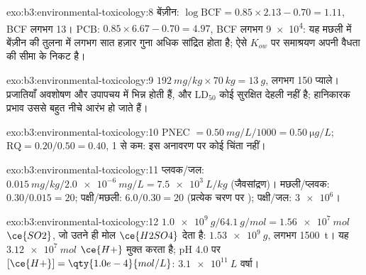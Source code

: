 \begin{solution}{exo:b3:environmental-toxicology:8}
बेंज़ीन: $\log\mathrm{BCF} = 0.85 \times 2.13 - 0.70 = 1.11$, BCF लगभग 13। PCB: $0.85 \times 6.67 - 0.70 = 4.97$, BCF लगभग
\num{9e4}: यह मछली में बेंज़ीन की तुलना में लगभग सात हज़ार गुना अधिक सांद्रित होता है; ऐसे
$K_{ow}$ पर समाश्रयण अपनी वैधता की सीमा के निकट है।
\end{solution}

\begin{solution}{exo:b3:environmental-toxicology:9}
$\qty{192}{mg/kg} \times \qty{70}{kg} = \qty{13}{g}$, लगभग 150 प्याले। प्रजातियाँ अवशोषण और उपापचय में भिन्न होती हैं,
और $\mathrm{LD_{50}}$ कोई सुरक्षित देहली नहीं है; हानिकारक प्रभाव उससे बहुत नीचे आरंभ हो जाते हैं।
\end{solution}

\begin{solution}{exo:b3:environmental-toxicology:10}
PNEC $= \qty{0.50}{mg/L}/1000 = \qty{0.50}{\micro g/L}$; $\mathrm{RQ} = 0.20/0.50 = 0.40$, 1 से कम: इस अनावरण पर कोई चिंता नहीं।
\end{solution}

\begin{solution}{exo:b3:environmental-toxicology:11}
प्लवक/जल: $\qty{0.015}{mg/kg}/\qty{2.0e-6}{mg/L} = \qty{7.5e3}{L/kg}$ (जैवसांद्रण)। मछली/प्लवक: $0.30/0.015 = 20$;
पक्षी/मछली: $6.0/0.30 = 20$ (प्रत्येक चरण पर ); पक्षी/जल: $\num{3e6}$।
\end{solution}

\begin{solution}{exo:b3:environmental-toxicology:12}
$\qty{1.0e9}{g}/\qty{64.1}{g/mol} = \qty{1.56e7}{mol}$ $\ce{SO2}$, जो उतने ही मोल $\ce{H2SO4}$ देता है: $\qty{1.53e9}{g}$, लगभग \qty{1500}{t}। यह
$\qty{3.12e7}{mol}$ $\ce{H+}$ मुक्त करता है; pH 4.0 पर $[\ce{H+}] = \qty{1.0e-4}{mol/L}$: $\qty{3.1e11}{L}$ वर्षा।
\end{solution}


